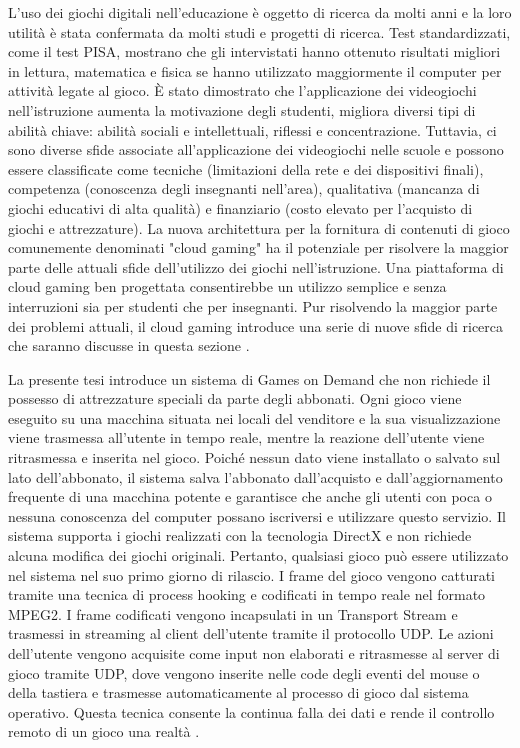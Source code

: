 L'uso dei giochi digitali nell'educazione è oggetto di ricerca da molti anni e la loro utilità è stata confermata da molti studi e progetti di ricerca. Test standardizzati, come il test PISA, mostrano che gli intervistati hanno ottenuto risultati migliori in lettura, matematica e fisica se hanno utilizzato maggiormente il computer per attività legate al gioco. È stato dimostrato che l'applicazione dei videogiochi nell'istruzione aumenta la motivazione degli studenti, migliora diversi tipi di abilità chiave: abilità sociali e intellettuali, riflessi e concentrazione. Tuttavia, ci sono diverse sfide associate all'applicazione dei videogiochi nelle scuole e possono essere classificate come tecniche (limitazioni della rete e dei dispositivi finali), competenza (conoscenza degli insegnanti nell'area), qualitativa (mancanza di giochi educativi di alta qualità) e finanziario (costo elevato per l'acquisto di giochi e attrezzature). La nuova architettura per la fornitura di contenuti di gioco comunemente denominati "cloud gaming" ha il potenziale per risolvere la maggior parte delle attuali sfide dell'utilizzo dei giochi nell'istruzione. Una piattaforma di cloud gaming ben progettata consentirebbe un utilizzo semplice e senza interruzioni sia per studenti che per insegnanti. Pur risolvendo la maggior parte dei problemi attuali, il cloud gaming introduce una serie di nuove sfide di ricerca che saranno discusse in questa sezione \parencite{Use_of_Cloud_Gaming_in_Education}.


La presente tesi introduce un sistema di Games on Demand che non richiede il possesso di attrezzature speciali da parte degli abbonati. Ogni gioco viene eseguito su una macchina situata nei locali del venditore e la sua visualizzazione viene trasmessa all'utente in tempo reale, mentre la reazione dell'utente viene ritrasmessa e inserita nel gioco. Poiché nessun dato viene installato o salvato sul lato dell'abbonato, il sistema salva l'abbonato dall'acquisto e dall'aggiornamento frequente di una macchina potente e garantisce che anche gli utenti con poca o nessuna conoscenza del computer possano iscriversi e utilizzare questo servizio. Il sistema supporta i giochi realizzati con la tecnologia DirectX e non richiede alcuna modifica dei giochi originali. Pertanto, qualsiasi gioco può essere utilizzato nel sistema nel suo primo giorno di rilascio. I frame del gioco vengono catturati tramite una tecnica di process hooking e codificati in tempo reale nel formato MPEG2. I frame codificati vengono incapsulati in un Transport Stream e trasmessi in streaming al client dell'utente tramite il protocollo UDP. Le azioni dell'utente vengono acquisite come input non elaborati e ritrasmesse al server di gioco tramite UDP, dove vengono inserite nelle code degli eventi del mouse o della tastiera e trasmesse automaticamente al processo di gioco dal sistema operativo. Questa tecnica consente la continua falla dei dati e rende il controllo remoto di un gioco una realtà \parencite{ARealTimeStreamingGamesonDemandSystem}.

